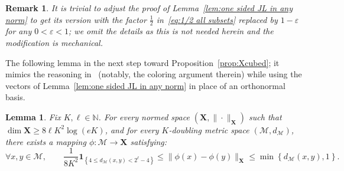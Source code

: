 \documentclass[11pt,reqno]{amsart}
\newtheorem{lemma}[theorem]{Lemma}
\newtheorem{remark}[theorem]{Remark}
\newcommand{\N}{\mathbb{N}}
\renewcommand{\le}{\leqslant}
\renewcommand{\ge}{\geqslant}
\newcommand{\X}{\mathbf X}
\newcommand{\MM}{\mathcal{M}}
\newcommand{\e}{\varepsilon}
\newcommand{\1}{\mathbf{1}}
\begin{document}
\begin{remark} {\em It is trivial to adjust the proof of Lemma~\ref{lem:one sided JL in any norm} to get its version with the factor $\frac12$ in~\eqref{eq:1/2 all subsets} replaced by $1-\e$ for any $0<\e<1$; we omit the details as this is not needed herein and the modification  is mechanical. }
\end{remark}

The following lemma in the next step toward Proposition~\ref{prop:Xcubed}; it mimics the reasoning in~\cite{Assouad} (notably, the coloring argument therein) while using  the vectors of Lemma~\ref{lem:one sided JL in any norm} in place of an orthonormal basis.


\begin{lemma}\label{lem:one scale} Fix $K,\ell\in \N$. For every normed space $(\X,\|\cdot\|_\X)$  such that $\dim \X\ge 8\ell K^2\log (eK)$, and for every $K$-doubling metric space $(\MM,d_\MM)$, there exists a mapping $\phi:\MM\to \X$ satisfying:
\begin{equation}\label{scale 1}
\forall x,y\in \MM,\qquad \frac{1}{8K^2}\1_{\left\{4\le d_\MM(x,y)< 2^{\ell}-4\right\}}\le \|\phi(x)-\phi(y)\|_\X\le \min\left\{d_\MM(x,y), 1\right\}. 
\end{equation}
\end{lemma}
\end{document}

